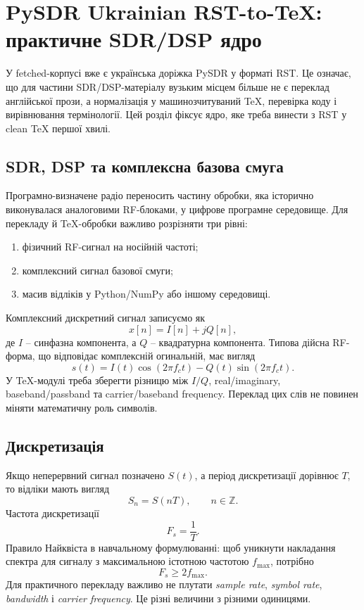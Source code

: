 
\chapter{PySDR Ukrainian RST-to-TeX: практичне SDR/DSP ядро}
\label{chap:pysdr_rst_tex_core}

У fetched-корпусі вже є українська доріжка PySDR у форматі RST. Це означає, що для частини SDR/DSP-матеріалу вузьким місцем більше не є переклад англійської прози, а нормалізація у машинозчитуваний TeX, перевірка коду і вирівнювання термінології. Цей розділ фіксує ядро, яке треба винести з RST у clean TeX першої хвилі.

\section{SDR, DSP та комплексна базова смуга}
Програмно-визначене радіо переносить частину обробки, яка історично виконувалася аналоговими RF-блоками, у цифрове програмне середовище. Для перекладу й TeX-обробки важливо розрізняти три рівні:
\begin{enumerate}
\item фізичний RF-сигнал на носійній частоті;
\item комплексний сигнал базової смуги;
\item масив відліків у Python/NumPy або іншому середовищі.
\end{enumerate}

Комплексний дискретний сигнал записуємо як
\begin{equation}
 x[n] = I[n] + j Q[n],
\end{equation}
де $I$ -- синфазна компонента, а $Q$ -- квадратурна компонента. Типова дійсна RF-форма, що відповідає комплексній огинальній, має вигляд
\begin{equation}
 s(t) = I(t)\cos(2\pi f_c t) - Q(t)\sin(2\pi f_c t).
\end{equation}
У TeX-модулі треба зберегти різницю між $I/Q$, real/imaginary, baseband/passband та carrier/baseband frequency. Переклад цих слів не повинен міняти математичну роль символів.

\section{Дискретизація}
Якщо неперервний сигнал позначено $S(t)$, а період дискретизації дорівнює $T$, то відліки мають вигляд
\begin{equation}
 S_n = S(nT), \qquad n\in\mathbb{Z}.
\end{equation}
Частота дискретизації
\begin{equation}
 F_s = \frac{1}{T}.
\end{equation}
Правило Найквіста в навчальному формулюванні: щоб уникнути накладання спектра для сигналу з максимальною істотною частотою $f_{\max}$, потрібно
\begin{equation}
 F_s \ge 2f_{\max}.
\end{equation}
Для практичного перекладу важливо не плутати \emph{sample rate}, \emph{symbol rate}, \emph{bandwidth} і \emph{carrier frequency}. Це різні величини з різними одиницями.

